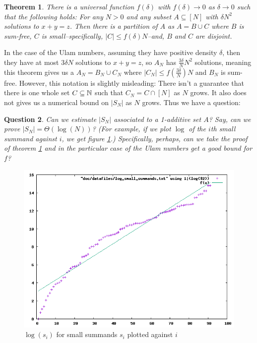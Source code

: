 \documentclass{report}
\newtheorem{theorem}{Theorem}[section]
\newtheorem{question}[theorem]{Question}
\theoremstyle{remark}
\numberwithin{equation}{section}
\begin{document}
\begin{theorem}\label{thm:green_triangle_removal}
  There is a universal function $f(\delta)$ with $f(\delta) \to 0$ as
  $\delta \to 0$ such that the following holds: For any $N > 0$ and
  any subset $A \subseteq [N]$ with $\delta N^2$ solutions to $x+y=z$.
  Then there is a partition of $A$ as $A = B \cup C$ where $B$ is
  sum-free, $C$ is small--specifically, $|C| \leq f(\delta)N$--and,
  $B$ and $C$ are disjoint.
\end{theorem}

In the case of the Ulam numbers, assuming they have positive density
$\delta$, then they have at most $3\delta N$ solutions to $x+y=z$, so
$A_N$ has $\frac{3\delta}{N} N^2$ solutions, meaning this theorem
gives us a $A_N = B_N \cup C_N$ where
$|C_N| \leq f(\frac{3\delta}{N})N$ and $B_N$ is sum-free.  However,
this notation is slightly misleading: There isn't a guarantee that
there is one whole set $C \subseteq \mathbb{N}$ such that $C_N = C \cap [N]$
as $N$ grows.  It also does not gives us a numerical bound on $|S_N|$
as $N$ grows.  Thus we have a question:

\begin{question}
  Can we estimate $|S_N|$ associated to a 1-additive set $A$?  Say,
  can we prove $|S_N| = \Theta(\log(N))$?  (For example, if we plot $\log$
  of the $i$th small summand against $i$, we get figure
  \ref{fig:log_ss}.)  Specifically, perhaps, can we take the proof of
  theorem \ref{thm:green_triangle_removal} and in the particular case
  of the Ulam numbers get a good bound for $f$?
\end{question}

\begin{figure}
\caption{$\log(s_i)$ for small summands $s_i$ plotted against
  $i$}\label{fig:log_ss}
\centering
\includegraphics[scale=0.5]{../figs/log_ss.png}
\end{figure}
\end{document}
